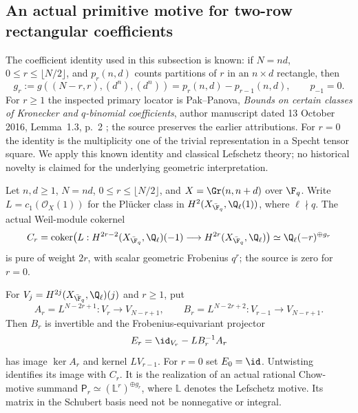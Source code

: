 \subsection{An actual primitive motive for two-row rectangular coefficients}
The coefficient identity used in this subsection is known:
if $N=nd$, $0\le r\le\lfloor N/2\rfloor$, and $p_r(n,d)$ counts
partitions of $r$ in an $n\times d$ rectangle, then
\begin{equation}\label{eq:rectprimitiveknown}
 g_r:=g((N-r,r),(d^n),(d^n))=p_r(n,d)-p_{r-1}(n,d),
 \qquad p_{-1}=0.
\end{equation}
For $r\ge1$ the inspected primary locator is Pak--Panova,
\emph{Bounds on certain classes of Kronecker and $q$-binomial
coefficients}, author manuscript dated 13 October 2016,
Lemma~1.3, p.~2 \cite{PPBounds}; the source preserves the earlier
attributions. For $r=0$ the identity is the multiplicity one of the
trivial representation in a Specht tensor square. We apply this
known identity and classical Lefschetz theory; no historical
novelty is claimed for the underlying geometric interpretation.

\begin{finding}\label{f:grassprimitive}
Let $n,d\ge1$, $N=nd$, $0\le r\le\lfloor N/2\rfloor$, and
$X=\Gr(n,n+d)$ over $\F_q$. Write $L=c_1(\mathcal O_X(1))$
for the Pl\"ucker class in $H^2(X_{\bar{\F}_q},\Q_\ell(1))$,
where $\ell\nmid q$. The actual Weil-module cokernel
\begin{equation}\label{eq:rectprimitivecoker}
 C_r=\operatorname{coker}\bigl(
 L:H^{2r-2}(X_{\bar{\F}_q},\Q_\ell)(-1)
       \longrightarrow H^{2r}(X_{\bar{\F}_q},\Q_\ell)\bigr)
 \simeq\Q_\ell(-r)^{\oplus g_r}
\end{equation}
is pure of weight $2r$, with scalar geometric Frobenius $q^r$;
the source is zero for $r=0$.

For $V_j=H^{2j}(X_{\bar{\F}_q},\Q_\ell)(j)$ and $r\ge1$, put
\[
 A_r=L^{N-2r+1}:V_r\longrightarrow V_{N-r+1},\qquad
 B_r=L^{N-2r+2}:V_{r-1}\longrightarrow V_{N-r+1}.
\]
Then $B_r$ is invertible and the Frobenius-equivariant projector
\begin{equation}\label{eq:rectprimitiveprojector}
 E_r=\id_{V_r}-L B_r^{-1}A_r
\end{equation}
has image $\ker A_r$ and kernel $L V_{r-1}$. For $r=0$ set
$E_0=\id$. Untwisting identifies its image with $C_r$.
It is the realization of an actual rational Chow-motive summand
$\mathsf P_r\simeq(\mathbb L^r)^{\oplus g_r}$, where
$\mathbb L$ denotes the Lefschetz motive. Its matrix in the
Schubert basis need not be nonnegative or integral.
\end{finding}

